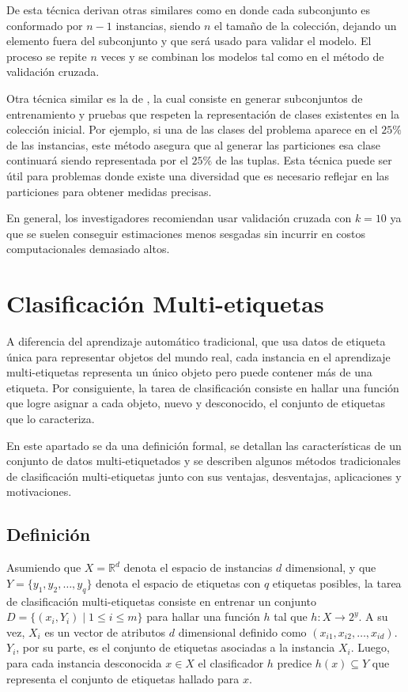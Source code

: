 De esta técnica derivan otras similares como 
en donde cada subconjunto es conformado por $n-1$ instancias, siendo $n$ el
tamaño de la colección, dejando un elemento fuera del subconjunto y que será
usado para validar el modelo. El proceso se repite $n$ veces y se combinan los
modelos tal como en el método de validación cruzada. 

Otra técnica similar es la de , la
cual consiste en generar subconjuntos de entrenamiento y pruebas que respeten la
representación de clases existentes en la colección inicial. Por ejemplo, si una
de las clases del problema aparece en el $25\%$ de las instancias, este método
asegura que al generar las particiones esa clase continuará siendo representada
por el $25\%$ de las tuplas. Esta técnica puede ser útil para problemas donde
existe una diversidad que es necesario reflejar en las particiones para obtener
medidas precisas.

En general, los investigadores recomiendan usar validación cruzada con $k=10$ ya
que se suelen conseguir estimaciones menos sesgadas sin incurrir en costos
computacionales demasiado altos.

\section{Clasificación Multi-etiquetas}

A diferencia del aprendizaje automático tradicional, que usa datos de etiqueta
única para representar objetos del mundo real, cada instancia en el aprendizaje
multi-etiquetas representa un único objeto pero puede contener más de una
etiqueta. Por consiguiente, la tarea de clasificación consiste en hallar una
función que logre asignar a cada objeto, nuevo y desconocido, el conjunto de
etiquetas que lo caracteriza.

En este apartado se da una definición formal, se detallan las características de
un conjunto de datos multi-etiquetados y se  describen algunos métodos
tradicionales de clasificación multi-etiquetas junto con sus ventajas,
desventajas, aplicaciones y motivaciones.

\subsection{Definición}
\label{mll_def_formal}

Asumiendo que $X=\mathbb{R}^{d}$ denota el espacio de instancias $d$
dimensional, y que $Y = \{y_{1}, y_{2}, \dots, y_{q}\}$ denota el espacio de
etiquetas con $q$ etiquetas posibles, la tarea de clasificación multi-etiquetas
consiste en entrenar un conjunto $D = \{(x_{i}, Y_{i}) \mid 1 \leq i \leq m\}$
para hallar una función $h$ tal que $h: X \rightarrow 2^y$. A su vez, $X_{i}$ es
un vector de atributos $d$ dimensional definido como $(x_{i1}, x_{i2}, \dots,
x_{id})$. $Y_{i}$, por su parte, es el conjunto de etiquetas asociadas a la
instancia $X_{i}$. Luego, para cada instancia desconocida $x \in X$ el
clasificador $h$ predice $h(x) \subseteq Y$ que representa el conjunto de
etiquetas hallado para $x$.

